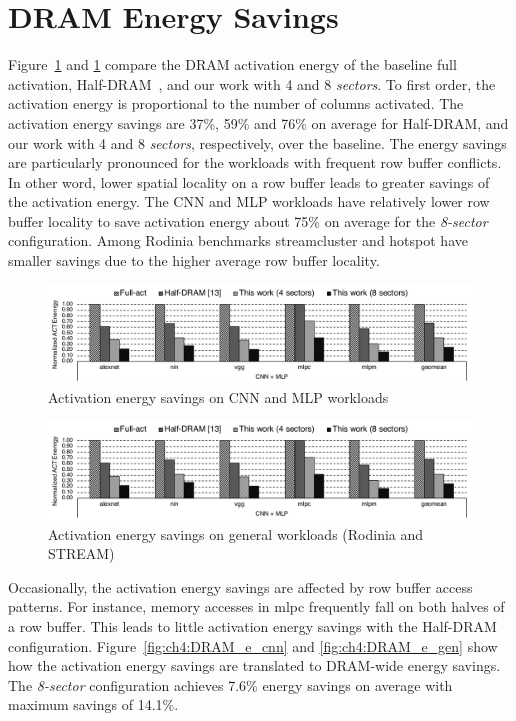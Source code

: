 \section{DRAM Energy Savings}
Figure~\ref{fig:ch4:act_e_cnn} and \ref{fig:ch4:act_e_cnn} compare the DRAM activation energy of the baseline full activation, Half-DRAM~, and our work with 4 and 8 \textit{sectors}. To first order, the activation energy is proportional to the number of columns activated. The activation energy savings are 37\%, 59\% and 76\% on average for Half-DRAM, and our work with 4 and 8 {\it sectors}, respectively, over the baseline. The energy savings are particularly pronounced for the workloads with frequent row buffer conflicts. In other word, lower spatial locality on a row buffer leads to greater savings of the activation energy. The CNN and MLP workloads have relatively lower row buffer locality to save activation energy about 75\% on average for the {\it 8-sector} configuration. Among Rodinia benchmarks streamcluster and hotspot have smaller savings due to the higher average row buffer locality.

\begin{figure}[t]
\centering
	\includegraphics[width=\linewidth, page=1]{figure/thesis-eval.pdf}
\caption{Activation energy savings on CNN and MLP workloads}
\label{fig:ch4:act_e_cnn}
\end{figure}

\begin{figure}[t]
    \centering
		\includegraphics[width=\linewidth, page=2]{figure/thesis-eval.pdf}
    \caption{Activation energy savings on general workloads (Rodinia and STREAM)}
    \label{fig:ch4:act_e_gen}
\end{figure}

Occasionally, the activation energy savings are affected by row buffer access patterns. For instance, memory accesses in mlpc frequently fall on both halves of a row buffer. This leads to little activation energy savings with the Half-DRAM configuration. Figure~\ref{fig:ch4:DRAM_e_cnn} and \ref{fig:ch4:DRAM_e_gen} show how the activation energy savings are translated to DRAM-wide energy savings. The {\it 8-sector} configuration achieves 7.6\% energy savings on average with maximum savings of 14.1\%.

